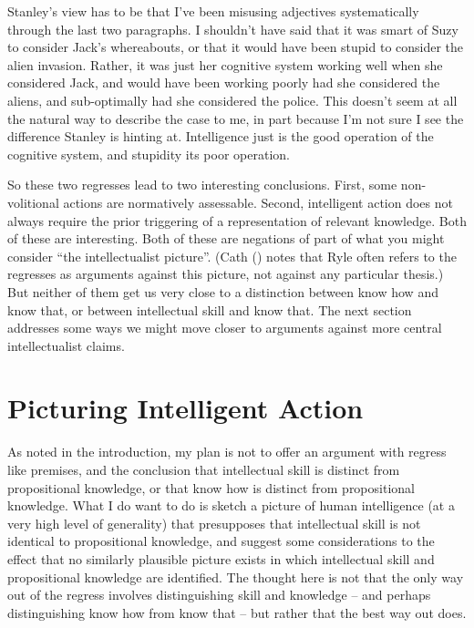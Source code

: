 \documentclass[
  11pt,
  letterpaper,
  DIV=11,
  numbers=noendperiod,
  twoside]{scrartcl}
\begin{document}
Stanley's view has to be that I've been misusing adjectives
systematically through the last two paragraphs. I shouldn't have said
that it was smart of Suzy to consider Jack's whereabouts, or that it
would have been stupid to consider the alien invasion. Rather, it was
just her cognitive system working well when she considered Jack, and
would have been working poorly had she considered the aliens, and
sub-optimally had she considered the police. This doesn't seem at all
the natural way to describe the case to me, in part because I'm not sure
I see the difference Stanley is hinting at. Intelligence just is the
good operation of the cognitive system, and stupidity its poor
operation.

So these two regresses lead to two interesting conclusions. First, some
non-volitional actions are normatively assessable. Second, intelligent
action does not always require the prior triggering of a representation
of relevant knowledge. Both of these are interesting. Both of these are
negations of part of what you might consider ``the intellectualist
picture''. (Cath () notes that Ryle often
refers to the regresses as arguments against this picture, not against
any particular thesis.) But neither of them get us very close to a
distinction between know how and know that, or between intellectual
skill and know that. The next section addresses some ways we might move
closer to arguments against more central intellectualist claims.

\section{Picturing Intelligent
Action}\label{picturing-intelligent-action}

As noted in the introduction, my plan is not to offer an argument with
regress like premises, and the conclusion that intellectual skill is
distinct from propositional knowledge, or that know how is distinct from
propositional knowledge. What I do want to do is sketch a picture of
human intelligence (at a very high level of generality) that presupposes
that intellectual skill is not identical to propositional knowledge, and
suggest some considerations to the effect that no similarly plausible
picture exists in which intellectual skill and propositional knowledge
are identified. The thought here is not that the only way out of the
regress involves distinguishing skill and knowledge -- and perhaps
distinguishing know how from know that -- but rather that the best way
out does.
\end{document}
